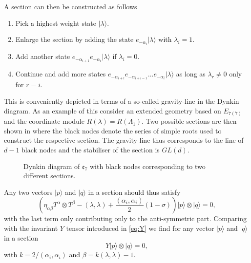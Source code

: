 A section can then be constructed as follows 
\begin{enumerate}
    \item Pick a highest weight state $|\lambda\rangle$.
    \item Enlarge the section by adding the state $e_{-\alpha_i}|\lambda\rangle$ with $\lambda_i=1$.
    \item Add another state $e_{-\alpha_{i+1}}e_{-\alpha_{i}}|\lambda\rangle$ if $\lambda_i=0$. 
    \item Continue and add more states $e_{-\alpha_{i+l}}e_{-\alpha_{i+l-1}}\ldots e_{-\alpha_{i}}|\lambda\rangle$ as long as $\lambda_{r}\neq 0$ only for $r=i$.
\end{enumerate}
This is conveniently depicted in terms of a so-called gravity-line in the Dynkin diagram. As an example of this consider an extended geometry based on $E_{7(7)}$ and the coordinate module $R(\lambda)=R(\Lambda_1)$. Two possible sections are then shown in  where the black nodes denote the series of simple roots used to construct the respective section. The gravity-line thus corresponds to the line of $d-1$ black nodes and the stabiliser of the section is $GL(d)$. 

\begin{figure}
    \caption{Dynkin diagram of $\mathfrak{e}_7$ with black nodes corresponding to two different sections.}
    \label{fig:E7WithSection}
\end{figure}

Any two vectors $|p\rangle$ and $|q\rangle$ in a section should thus satisfy 
\begin{equation}
    \left(\eta_{\alpha\beta}T^\alpha\otimes T^\beta-(\lambda,\lambda)+\frac{(\alpha_i,\alpha_i)}{2}(1-\sigma)\right)|p\rangle\otimes|q\rangle = 0,
\end{equation}
with the last term only contributing only to the anti-symmetric part. Comparing with the invariant $Y$ tensor introduced in \eqref{eq:Y} we find for any vector $|p\rangle$ and $|q\rangle$ in a section 
\begin{equation}
    Y|p\rangle\otimes|q\rangle = 0,
\end{equation}
with $k=2/(\alpha_i,\alpha_i)$ and $\beta=k(\lambda,\lambda)-1$. 

